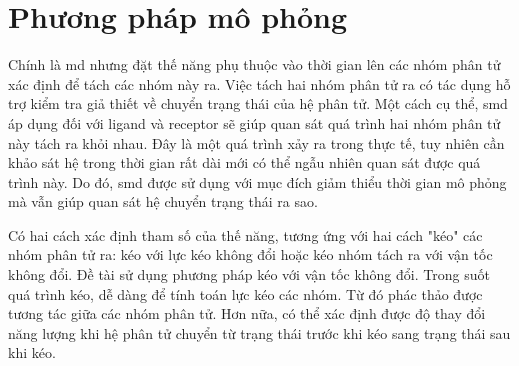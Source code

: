 \documentclass[12pt,a4paper,reqno, oneside]{book}
\begin{document}
\section{Phương pháp mô phỏng }
Chính là \gls{md} nhưng đặt thế năng phụ thuộc vào thời gian lên các nhóm phân tử xác định để tách các nhóm này ra. Việc tách hai nhóm phân tử ra có tác dụng hỗ trợ kiểm tra giả thiết về chuyển trạng thái của hệ phân tử. Một cách cụ thể, \gls{smd} áp dụng đối với \gls{ligand} và \gls{receptor} sẽ giúp quan sát quá trình hai nhóm phân tử này tách ra khỏi nhau. Đây là một quá trình xảy ra trong thực tế, tuy nhiên cần khảo sát hệ trong thời gian rất dài mới có thể ngẫu nhiên quan sát được quá trình này. Do đó, \gls{smd} được sử dụng với mục đích giảm thiểu thời gian mô phỏng mà vẫn giúp quan sát hệ chuyển trạng thái ra sao.

Có hai cách xác định tham số của thế năng, tương ứng với hai cách "kéo" các nhóm phân tử ra: kéo với lực kéo không đổi hoặc kéo nhóm tách ra với vận tốc không đổi. Đề tài sử dụng phương pháp kéo với vận tốc không đổi\cite{Lu1998}. Trong suốt quá trình kéo, dễ dàng để tính toán lực kéo các nhóm. Từ đó phác thảo được tương tác giữa các nhóm phân tử. Hơn nữa, có thể xác định được độ thay đổi năng lượng khi hệ phân tử chuyển từ trạng thái trước khi kéo sang trạng thái sau khi kéo.

\end{document}
